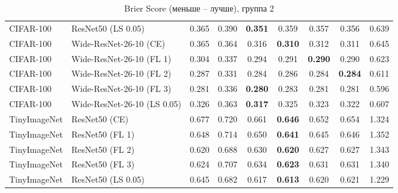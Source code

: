 \begin{table}[h!]
{\begin{tabular}{llccccccc}
   CIFAR-100 &          ResNet50 (LS 0.05) &         0.365 &        0.390 & \textbf{0.351} &                  0.359 &                  0.357 &                  0.356 &                  0.639 \\
   CIFAR-100 &      Wide-ResNet-26-10 (CE) &         0.365 &        0.364 &                  0.316 & \textbf{0.310} &                  0.312 &                  0.311 &                  0.645 \\
   CIFAR-100 &    Wide-ResNet-26-10 (FL 1) &         0.304 &        0.337 &                  0.294 &                  0.291 & \textbf{0.290} &                  0.290 &                  0.623 \\
   CIFAR-100 &    Wide-ResNet-26-10 (FL 2) &         0.287 &        0.331 &                  0.284 &                  0.286 &                  0.284 & \textbf{0.284} &                  0.611 \\
   CIFAR-100 &    Wide-ResNet-26-10 (FL 3) &         0.281 &        0.336 & \textbf{0.280} &                  0.283 &                  0.281 &                  0.281 &                  0.596 \\
   CIFAR-100 & Wide-ResNet-26-10 (LS 0.05) &         0.326 &        0.363 & \textbf{0.317} &                  0.325 &                  0.323 &                  0.322 &                  0.607 \\
TinyImageNet &               ResNet50 (CE) &         0.677 &        0.720 &                  0.661 & \textbf{0.646} &                  0.652 &                  0.654 &                  1.324 \\
TinyImageNet &             ResNet50 (FL 1) &         0.648 &        0.714 &                  0.650 & \textbf{0.641} &                  0.645 &                  0.646 &                  1.352 \\
TinyImageNet &             ResNet50 (FL 2) &         0.620 &        0.688 &                  0.630 & \textbf{0.620} &                  0.627 &                  0.627 &                  1.343 \\
TinyImageNet &             ResNet50 (FL 3) &         0.624 &        0.707 &                  0.634 & \textbf{0.623} &                  0.631 &                  0.631 &                  1.340 \\
TinyImageNet &          ResNet50 (LS 0.05) &         0.645 &        0.682 &                  0.617 & \textbf{0.613} &                  0.620 &                  0.621 &                  1.229 \\
\bottomrule
\end{tabular}%
}
\caption{Brier Score (меньше -- лучше), группа 2}
\label{tab:metrics:BS_2}
\end{table}
